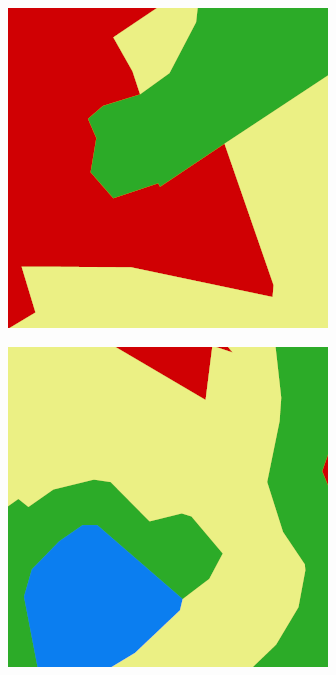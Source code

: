 \begin{figure}
    \vspace{3mm}

    \hfill
    \begin{subfigure}{\DopLabelImageWidth}
        \includegraphics[width=\textwidth]{images/186_label}
    \end{subfigure}
    \hfill
    \begin{subfigure}{\DopLabelImageWidth}
        \includegraphics[width=\textwidth]{images/583_label}

\end{subfigure}
\end{figure}
